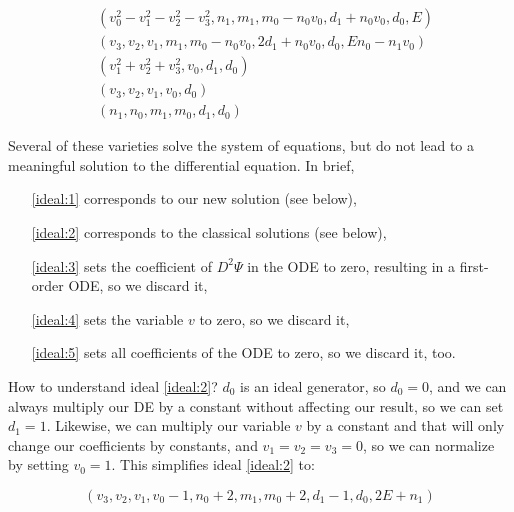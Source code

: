 \documentclass{article}
\begin{document}
\begin{subequations}
\begin{align}
& \left(v_{0}^{2} - v_{1}^{2} - v_{2}^{2} - v_{3}^{2}, n_{1}, m_{1}, m_{0} - n_{0} v_{0}, d_{1} + n_{0} v_{0}, d_{0}, E\right)\label{ideal:1} \\
& \left(v_{3}, v_{2}, v_{1}, m_{1}, m_{0} - n_{0} v_{0}, 2 d_{1} + n_{0} v_{0}, d_{0}, E n_{0} - n_{1} v_{0}\right)\label{ideal:2}\\
& \left(v_{1}^{2} + v_{2}^{2} + v_{3}^{2}, v_{0}, d_{1}, d_{0}\right)\label{ideal:3}\\
& \left(v_{3}, v_{2}, v_{1}, v_{0}, d_{0}\right)\label{ideal:4}\\
& \left(n_{1}, n_{0}, m_{1}, m_{0}, d_{1}, d_{0}\right)\label{ideal:5}
\end{align}
\end{subequations}

Several of these varieties solve the system of equations, but do not lead to a meaningful solution to the differential equation.
In brief,

\begin{itemize}
\item[\eqref{ideal:1}] corresponds to our new solution (see below),
\item[\eqref{ideal:2}] corresponds to the classical solutions (see below),
\item[\eqref{ideal:3}] sets the coefficient of
$D^2\Psi$
in the ODE to zero, resulting in a first-order ODE, so we discard it,
\item[\eqref{ideal:4}] sets the variable $v$ to zero, so we discard it,
\item[\eqref{ideal:5}] sets all coefficients of the ODE to zero, so we discard it, too.

\end{itemize}

How to understand ideal \eqref{ideal:2}?  $d_0$ is an ideal generator,
so $d_0=0$, and we can always multiply our DE by a constant without affecting our result, so we can set $d_1=1$.
Likewise, we can multiply our variable $v$ by a constant and that will only change our coefficients by constants,
and $v_1=v_2=v_3=0$, so we can normalize by setting $v_0=1$.  This simplifies ideal \eqref{ideal:2} to:

\begin{equation}
\left(v_{3}, v_{2}, v_{1}, v_{0} - 1, n_{0} + 2, m_{1}, m_{0} + 2, d_{1} - 1, d_{0}, 2 E + n_{1}\right)
\end{equation}
\end{document}
